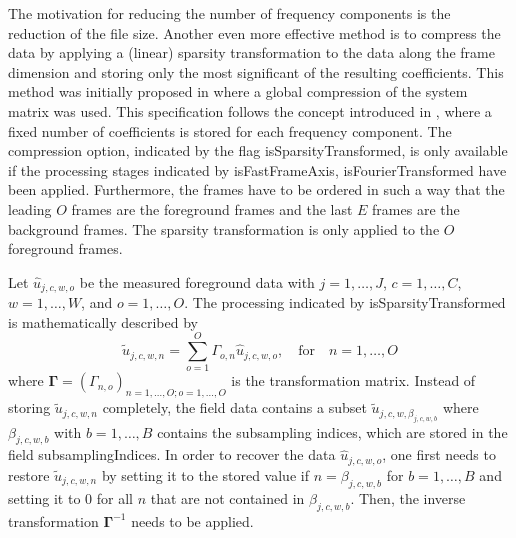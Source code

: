 \documentclass[landscape,a4paper]{article} %
\newcommand{\inlvar}[1]{{\ttfamily#1}}
\begin{document}
\begin{multicols}{2}
The motivation for reducing the number of frequency components is the reduction of the file size. Another even more effective method is to compress the data by applying a (linear) sparsity transformation to the data along the frame dimension and storing only the most significant of the resulting coefficients. This method was initially proposed in \cite{lampe2012fast} where a global compression of the system matrix was used. This specification follows the concept introduced in \cite{knopp2015compression}, where a fixed number of coefficients is stored for each frequency component. 
The compression option, indicated by the flag \inlvar{isSparsityTransformed}, is only available if the processing stages indicated by \inlvar{isFastFrameAxis}, \inlvar{isFourierTransformed} have been applied. Furthermore, the frames have to be ordered in such a way that the leading $O$ frames are the foreground frames and the last $E$ frames are the background frames. The sparsity transformation is only applied to the $O$ foreground frames. 

Let $\hat{u}_{j,c,w,o}$ be the measured foreground data with $j=1,\dots,J$, $c=1,\dots,C$, $w=1,\dots,W$, and $o=1,\dots,O$. The processing indicated by \inlvar{isSparsityTransformed} is mathematically described by 
\begin{equation*}
 \tilde{u}_{j,c,w,n} = \sum_{o=1}^{O} \Gamma_{o,n} \hat{u}_{j,c,w,o}, \quad \text{for} \quad n=1,\dots,O
\end{equation*}
where $\mathbf{\Gamma} = \left( \Gamma_{n,o} \right)_{n=1,\dots,O; o=1,\dots,O}$ is the transformation matrix.
Instead of storing $\tilde{u}_{j,c,w,n}$ completely, the field \inlvar{data} contains a subset $\tilde{u}_{j,c,w,\beta_{j,c,w,b}}$ where $\beta_{j,c,w,b}$ with $b=1,\dots,B$ contains the subsampling indices, which are stored in the field \inlvar{subsamplingIndices}. In order to recover the data $\hat{u}_{j,c,w,o}$, one first needs to restore $\tilde{u}_{j,c,w,n}$ by setting it to the stored value if $n=\beta_{j,c,w,b}$ for $b=1,\dots,B$ and setting it to 0 for all $n$ that are not contained in $\beta_{j,c,w,b}$. Then, the inverse transformation $\mathbf{\Gamma}^{-1}$ needs to be applied.


\end{multicols}
\end{document}
